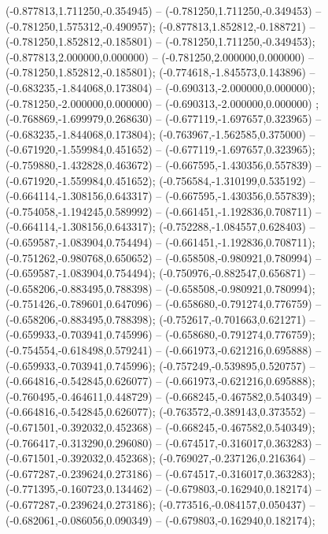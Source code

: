  (-0.877813,1.711250,-0.354945) -- (-0.781250,1.711250,-0.349453) -- (-0.781250,1.575312,-0.490957);
 (-0.877813,1.852812,-0.188721) -- (-0.781250,1.852812,-0.185801) -- (-0.781250,1.711250,-0.349453);
 (-0.877813,2.000000,0.000000) -- (-0.781250,2.000000,0.000000) -- (-0.781250,1.852812,-0.185801);
 (-0.774618,-1.845573,0.143896) -- (-0.683235,-1.844068,0.173804) -- (-0.690313,-2.000000,0.000000);
 (-0.781250,-2.000000,0.000000) -- (-0.690313,-2.000000,0.000000) ;
 (-0.768869,-1.699979,0.268630) -- (-0.677119,-1.697657,0.323965) -- (-0.683235,-1.844068,0.173804);
 (-0.763967,-1.562585,0.375000) -- (-0.671920,-1.559984,0.451652) -- (-0.677119,-1.697657,0.323965);
 (-0.759880,-1.432828,0.463672) -- (-0.667595,-1.430356,0.557839) -- (-0.671920,-1.559984,0.451652);
 (-0.756584,-1.310199,0.535192) -- (-0.664114,-1.308156,0.643317) -- (-0.667595,-1.430356,0.557839);
 (-0.754058,-1.194245,0.589992) -- (-0.661451,-1.192836,0.708711) -- (-0.664114,-1.308156,0.643317);
 (-0.752288,-1.084557,0.628403) -- (-0.659587,-1.083904,0.754494) -- (-0.661451,-1.192836,0.708711);
 (-0.751262,-0.980768,0.650652) -- (-0.658508,-0.980921,0.780994) -- (-0.659587,-1.083904,0.754494);
 (-0.750976,-0.882547,0.656871) -- (-0.658206,-0.883495,0.788398) -- (-0.658508,-0.980921,0.780994);
 (-0.751426,-0.789601,0.647096) -- (-0.658680,-0.791274,0.776759) -- (-0.658206,-0.883495,0.788398);
 (-0.752617,-0.701663,0.621271) -- (-0.659933,-0.703941,0.745996) -- (-0.658680,-0.791274,0.776759);
 (-0.754554,-0.618498,0.579241) -- (-0.661973,-0.621216,0.695888) -- (-0.659933,-0.703941,0.745996);
 (-0.757249,-0.539895,0.520757) -- (-0.664816,-0.542845,0.626077) -- (-0.661973,-0.621216,0.695888);
 (-0.760495,-0.464611,0.448729) -- (-0.668245,-0.467582,0.540349) -- (-0.664816,-0.542845,0.626077);
 (-0.763572,-0.389143,0.373552) -- (-0.671501,-0.392032,0.452368) -- (-0.668245,-0.467582,0.540349);
 (-0.766417,-0.313290,0.296080) -- (-0.674517,-0.316017,0.363283) -- (-0.671501,-0.392032,0.452368);
 (-0.769027,-0.237126,0.216364) -- (-0.677287,-0.239624,0.273186) -- (-0.674517,-0.316017,0.363283);
 (-0.771395,-0.160723,0.134462) -- (-0.679803,-0.162940,0.182174) -- (-0.677287,-0.239624,0.273186);
 (-0.773516,-0.084157,0.050437) -- (-0.682061,-0.086056,0.090349) -- (-0.679803,-0.162940,0.182174);
